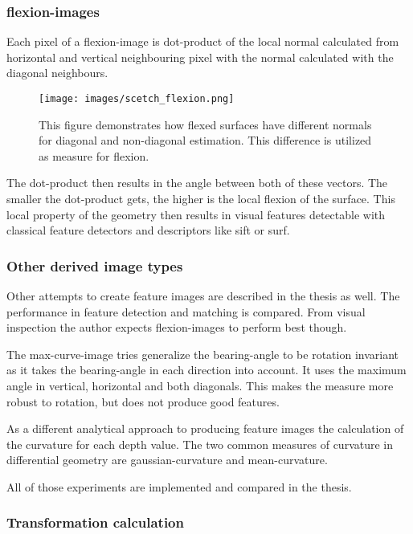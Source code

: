 \documentclass[doktyp=marbeit,fontsize=12pt,sprache=english,draft=true,hausschrift=true]{TUBAFarbeiten}
\begin{document}
\subsubsection{\Glspl{flexion-image}}

Each pixel of a \Gls{flexion-image} is dot-product of the local normal
calculated from horizontal and vertical neighbouring pixel with the
normal calculated with the diagonal neighbours.

\begin{figure}[H]
    \centering
    \texttt{[image: images/scetch\_flexion.png]}
    \caption{This figure demonstrates how flexed surfaces have different normals for diagonal and non-diagonal estimation. This difference is utilized as measure for flexion.}
\end{figure}

The dot-product then results in the angle between both of these vectors.
The smaller the dot-product gets, the higher is the local flexion of the
surface. This local property of the geometry then results in visual
features detectable with classical feature detectors and descriptors like
\Gls{sift} or \Gls{surf}.

\subsubsection{Other derived image types}

Other attempts to create feature images are described in the thesis as well.
The performance in feature detection and matching is compared.
From visual inspection the author expects \Glspl{flexion-image} to perform best though.

The \gls{max-curve-image} tries generalize the \gls{bearing-angle} to be rotation invariant as it takes the \gls{bearing-angle} in each direction into account.
It uses the maximum angle in vertical, horizontal and both diagonals.
This makes the measure more robust to rotation, but does not produce good features.

As a different analytical approach to producing feature images the calculation of the \gls{curvature} for each depth value.
The two common measures of curvature in differential geometry are \gls{gaussian-curvature} and \gls{mean-curvature}\cite{Kuhnel2008}.

All of those experiments are implemented and compared in the thesis.

\subsubsection{Transformation calculation}\label{transformation-calculation}
\end{document}
